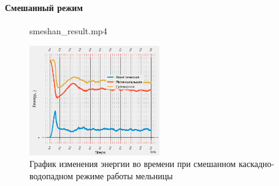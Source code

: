 \documentclass[c]{beamer}  %
\begin{document}
\begin{frame}
\frametitle{\insertsection} 
\framesubtitle{Смешанный режим}

\begin{figure}[ht]
     		{smeshan_result.mp4}
\end{figure}
\begin{figure}[H]
	\centering
	\includegraphics[width=0.5\textwidth]{smeshan_energy} 
	\caption{График изменения энергии во времени при смешанном каскадно-водопадном режиме работы мельницы}
	\label{pic:smeshan_energy}
\end{figure} 
\end{frame}
\end{document}
